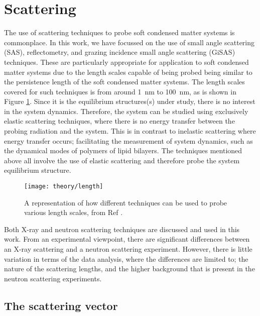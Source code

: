 \section{Scattering}

The use of scattering techniques to probe soft condensed matter systems is commonplace. In this work, we have focussed on the use of small angle scattering (SAS), reflectometry, and grazing incidence small angle scattering (GiSAS) techniques. These are particularly appropriate for application to soft condensed matter systems due to the length scales capable of being probed being similar to the persistence length of the soft condensed matter systems. The length scales covered for such techniques is from around \SI{1}{\nano\metre} to \SI{100}{\nano\metre}, as is shown in Figure \ref{fig:lengths}. Since it is the equilibrium structures(s) under study, there is no interest in the system dynamics. Therefore, the system can be studied using exclusively elastic scattering techniques, where there is no energy transfer between the probing radiation and the system. This is in contrast to inelastic scattering where energy transfer occurs; facilitating the measurement of system dynamics, such as the dynamical modes of polymers of lipid bilayers.\cite{Sakai2009, Farago2009} The techniques mentioned above all involve the use of elastic scattering and therefore probe the system equilibrium structure.
%
\begin{figure}
	\centering
	\texttt{[image: theory/length]}
	\caption{A representation of how different techniques can be used to probe various length scales, from Ref \cite{Sivia2011}.}
	\label{fig:lengths}
\end{figure}
%

Both X-ray and neutron scattering techniques are discussed and used in this work. From an experimental viewpoint, there are significant differences between an X-ray scattering and a neutron scattering experiment. However, there is little variation in terms of the data analysis, where the differences are limited to; the nature of the scattering lengths, and the higher background that is present in the neutron scattering experiments.

\subsection{The scattering vector}

